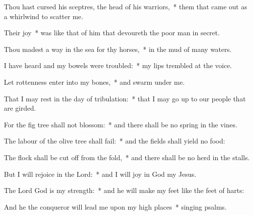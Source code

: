 \begin{enpars}
\item Thou hast cursed his sceptres, the head of his warriors,~* them that came out as a whirlwind to scatter me.
\item Their joy~* was like that of him that devoureth the poor man in secret.
\item Thou madest a way in the sea for thy horses,~* in the mud of many waters.
\item I have heard and my bowels were troubled:~* my lips trembled at the voice.
\item Let rottenness enter into my bones,~* and swarm under me.
\item That I may rest in the day of tribulation:~* that I may go up to our people that are girded.
\item For the fig tree shall not blossom:~* and there shall be no spring in the vines.
\item The labour of the olive tree shall fail:~* and the fields shall yield no food:
\item The flock shall be cut off from the fold,~* and there shall be no herd in the stalls.
\item But I will rejoice in the Lord:~* and I will joy in God my Jesus.
\item The Lord God is my strength:~* and he will make my feet like the feet of harts:
\item And he the conqueror will lead me upon my high places~* singing psalms.
\end{enpars}